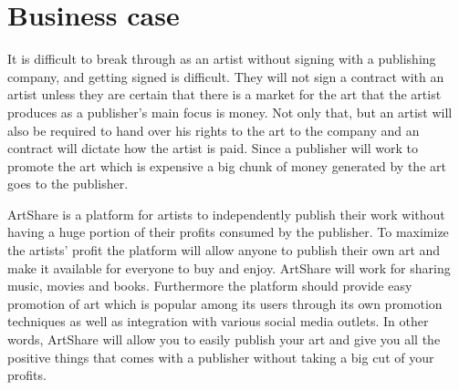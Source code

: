 \documentclass[../report.tex]{subfiles}
\begin{document}
\section{Business case}
It is difficult to break through as an artist without signing with a publishing company, and getting signed is difficult. They will not sign a contract with an artist unless they are certain that there is a market for the art that the artist produces as a publisher's main focus is money. Not only that, but an artist will also be required to hand over his rights to the art to the company and an contract will dictate how the artist is paid. Since a publisher will work to promote the art which is expensive a big chunk of money generated by the art goes to the publisher.



\noindent ArtShare is a platform for artists to independently publish their work without having a huge portion of their profits consumed by the publisher. To maximize the artists' profit the platform will allow anyone to publish their own art and make it available for everyone to buy and enjoy. ArtShare will work for sharing music, movies and books. Furthermore the platform should provide easy promotion of art which is popular among its users through its own promotion techniques as well as integration with various social media outlets. In other words, ArtShare will allow you to easily publish your art and give you all the positive things that comes with a publisher without taking a big cut of your profits. 

\end{document}
